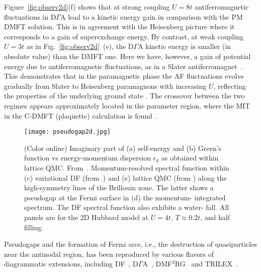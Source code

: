 \documentclass[rmp,aps,reprint,amsmath,amssymb,superscriptaddress,showpacs,nofootinbib]{revtex4-1}
\begin{document}
Figure~\ref{fig:observ2d}(f) shows that at strong coupling $U=8t$ antiferromagnetic fluctuations in D$\Gamma$A lead to a  kinetic energy gain in comparison with the PM DMFT solution. This is in agreement with the Heisenberg picture where it corresponds to a gain of superexchange energy. By contrast, at weak coupling  $U=3t$ as in Fig.~\ref{fig:observ2d}~(e), the D$\Gamma$A kinetic energy is smaller (in absolute value) than the DMFT one. Here we have, however, a gain of potential energy due to antiferromagnetic fluctuations, as in a Slater antiferromagnet~\cite{Rohringer2016,vanLoon2017}. This demonstrates that in the paramagnetic phase the AF fluctuations evolve gradually from Slater to Heisenberg paramagnons with increasing $U$, reflecting the properties of the underlying ground state \cite{Borejsza2004}. The crossover between the two regimes appears approximately located in the parameter region, where the MIT in the C-DMFT (plaquette) calculation is found \cite{Fratino2017}. 
 
\begin{figure}[t]
\begin{center}
  \texttt{[image: pseudogap2d.jpg]} 
\end{center}
    \caption{(Color online) Imaginary part of (a) self-energy  and (b) Green's function vs energy-momentum dispersion $\epsilon_k$  as obtained within lattice QMC. From~. Momentum-resolved spectral function within (c) variational DF (from~) and (e) lattice QMC (from ) along the high-symmetry lines of the Brillouin zone. The
latter shows a pseudogap at the Fermi surface in (d) the momentum-
integrated spectrum. The DF spectral function also exhibits a water-
fall. All panels are for the 2D Hubbard model  at $U=4t$, $T\approx 0.2t$, and half filling.}
\label{fig:pseudogap2d}
\end{figure}

Pseudogaps and the formation of Fermi arcs, i.e., the destruction of quasiparticles near the antinodal region, has been reproduced by various flavors of diagrammatic extensions, including DF~\cite{Rubtsov2009}, D$\Gamma$A~\cite{Katanin2009}, DMF$^{2}$RG~\cite{Taranto2014} and TRILEX~\cite{Ayral2015}. 
\end{document}
